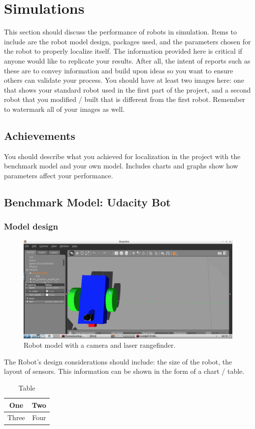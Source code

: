 \documentclass[10pt,journal,compsoc]{IEEEtran}
\begin{document}
\section{Simulations}
This section should discuss the performance of robots in simulation. Items to include are the robot model design, packages used, and the parameters chosen for the robot to properly localize itself. The information provided here is critical if anyone would like to replicate your results. After all, the intent of reports such as these are to convey information and build upon ideas so you want to ensure others can validate your process.
You should have at least two images here: one that shows your standard robot used in the first part of the project, and a second robot that you modified / built that is different from the first robot. Remember to watermark all of your images as well. 

\subsection{Achievements}
You should describe what you achieved for localization in the project with the benchmark model and your own model. Includes charts and graphs show how parameters affect your performance. 

\subsection{Benchmark Model: Udacity Bot}
\subsubsection{Model design}

\begin{figure}[thpb]
      \centering
      \includegraphics[width=\linewidth]{laserrangefinder.png}
      \caption{Robot model with a camera and laser rangefinder.}
      \label{fig:robot1}
\end{figure}
The Robot's design considerations should include: the size of the robot, the layout of sensors. This information can be shown in the form of a chart / table.
\begin{table}[h]
\caption{Table}
\label{table_example}
\begin{center}
\begin{tabular}{|c||c|}
\hline
One & Two\\
\hline
Three & Four\\
\hline
\end{tabular}
\end{center}
\end{table}
\end{document}
